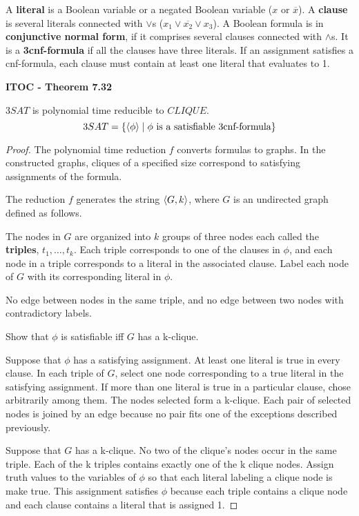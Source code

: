 A \textbf{literal} is a Boolean variable or a negated Boolean variable ($x$ or $\overline{x}$). A \textbf{clause} is several literals connected with $\lor$s ($x_1 \lor \overline{x_2} \lor x_3$). A Boolean formula is in \textbf{conjunctive normal form}, if it comprises several clauses connected with $\land$s. It is a \textbf{3cnf-formula} if all the clauses have three literals. If an assignment satisfies a cnf-formula, each clause must contain at least one literal that evaluates to 1.

\label{lang:3SAT_CLIQUE}
\begin{shaded}
\textbf{ITOC - Theorem 7.32}

\medskip
$3SAT$ is polynomial time reducible to $CLIQUE$.
\[
3SAT = \{ \langle{\phi}\rangle  \mid \text{$\phi$ is a satisfiable 3cnf-formula}\}
\]
\end{shaded}

\begin{mdframed}
\begin{proof}
The polynomial time reduction $f$ converts formulas to graphs. In the constructed graphs, cliques of a specified size correspond to satisfying assignments of the formula.

The reduction $f$ generates the string $\langle{G, k}\rangle$, where $G$ is an undirected graph defined as follows.

The nodes in $G$ are organized into $k$ groups of three nodes each called the \textbf{triples}, $t_1, \ldots, t_k$. Each triple corresponds to one of the clauses in $\phi$, and each node in a triple corresponds to a literal in the associated clause. Label each node of $G$ with its corresponding literal in $\phi$.

No edge between nodes in the same triple, and no edge between two nodes with contradictory labels.

Show that $\phi$ is satisfiable iff $G$ has a k-clique.

Suppose that $\phi$ has a satisfying assignment. At least one literal is true in every clause. In each triple of $G$, select one node corresponding to a true literal in the satisfying assignment. If more than one literal is true in a particular clause, chose arbitrarily among them. The nodes selected form a k-clique. Each pair of selected nodes is joined by an edge because no pair fits one of the exceptions described previously.

Suppose that $G$ has a k-clique. No two of the clique's nodes occur in the same triple. Each of the k triples contains exactly one of the k clique nodes. Assign truth values to the variables of $\phi$ so that each literal labeling a clique node is make true. This assignment satisfies $\phi$ because each triple contains a clique node and each clause contains a literal that is assigned 1.
\end{proof}
\end{mdframed}

